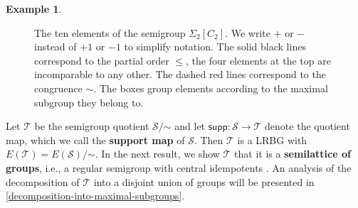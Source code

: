 \documentclass[11pt, oneside, reqno]{amsart}
\theoremstyle{definition}
\newtheorem{example}[theorem]{Example}
\numberwithin{equation}{section}
\newcommand{\defn}[1]{{\color{RoyalBlue}\bf#1}}
\def \SS{{\mathcal{S}}}
\def \TT{{\mathcal{T}}}
\def \ztwo {{C_2}}
\def \supp{\mathsf{supp}}
\begin{document}
\begin{example}
\begin{figure}[ht]
        \caption{The ten elements of the semigroup $\Sigma_2[\ztwo]$.
        We write $+$ or $-$ instead of $+1$ or $-1$ to simplify notation.
        The solid black lines correspond to the partial order $\leq$, the four elements at the top are incomparable to any other.
        The dashed red lines correspond to the congruence $\sim$.
        The boxes group elements according to the maximal subgroup they belong to.}
        \label{fig:hsiao-C2-relations}
    \end{figure}
\end{example}

Let $\TT$ be the semigroup quotient $\SS/\mathord{\sim}$ and let $\supp: \SS
\to \TT$ denote the quotient map, which we call the \defn{support map} of
$\SS$. Then $\TT$ is a LRBG with $E(\TT) = E(\SS)/\mathord{\sim}$.
In the next result, we show $\TT$ that it is a \defn{semilattice of groups},
i.e., a regular semigroup with central idempotents \citep{cp61semigroupsI}.
An analysis of the decomposition of $\TT$ into a disjoint union of groups will
be presented in \cref{decomposition-into-maximal-subgroups}.
\end{document}
